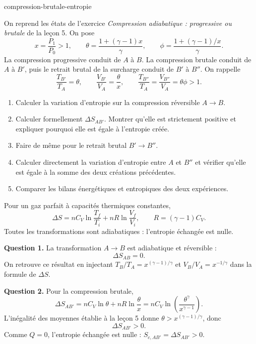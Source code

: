 \begin{exo}{compression-brutale-entropie}

On reprend les états de l'exercice \textit{Compression adiabatique :
progressive ou brutale} de la leçon 5. On pose
\[
x=\frac{P_1}{P_0}>1,
\qquad
\theta=\frac{1+(\gamma-1)x}{\gamma},
\qquad
\phi=\frac{1+(\gamma-1)/x}{\gamma}.
\]
La compression progressive conduit de $A$ à $B$. La compression brutale
conduit de $A$ à $B'$, puis le retrait brutal de la surcharge conduit de $B'$
à $B''$. On rappelle
\[
\frac{T_{B'}}{T_A}=\theta,
\qquad
\frac{V_{B'}}{V_A}=\frac{\theta}{x},
\qquad
\frac{T_{B''}}{T_A}
=\frac{V_{B''}}{V_A}
=\theta\phi>1.
\]

\begin{enumerate}
\item Calculer la variation d'entropie sur la compression réversible
$A\to B$.
\item Calculer formellement $\Delta S_{AB'}$. Montrer qu'elle est strictement
positive et expliquer pourquoi elle est égale à l'entropie créée.
\item Faire de même pour le retrait brutal $B'\to B''$.
\item Calculer directement la variation d'entropie entre $A$ et $B''$ et
vérifier qu'elle est égale à la somme des deux créations précédentes.
\item Comparer les bilans énergétiques et entropiques des deux expériences.
\end{enumerate}

\begin{indication}
Pour un gaz parfait à capacités thermiques constantes,
\[
\Delta S=nC_V\ln\frac{T_f}{T_i}
+nR\ln\frac{V_f}{V_i},
\qquad
R=(\gamma-1)C_V.
\]
Toutes les transformations sont adiabatiques : l'entropie échangée est nulle.
\end{indication}

\begin{solution}
\textbf{Question 1.} La transformation $A\to B$ est adiabatique et
réversible :
\[
\Delta S_{AB}=0.
\]
On retrouve ce résultat en injectant
$T_B/T_A=x^{(\gamma-1)/\gamma}$ et $V_B/V_A=x^{-1/\gamma}$ dans la formule
de $\Delta S$.

\textbf{Question 2.} Pour la compression brutale,
\[
\Delta S_{AB'}
=nC_V\ln\theta+nR\ln\frac{\theta}{x}
=nC_V\ln\left(\frac{\theta^\gamma}{x^{\gamma-1}}\right).
\]
L'inégalité des moyennes établie à la leçon 5 donne
$\theta>x^{(\gamma-1)/\gamma}$, donc
\[
\Delta S_{AB'}>0.
\]
Comme $Q=0$, l'entropie échangée est nulle :
$S_{c,AB'}=\Delta S_{AB'}>0$.


\end{solution}
\end{exo}
